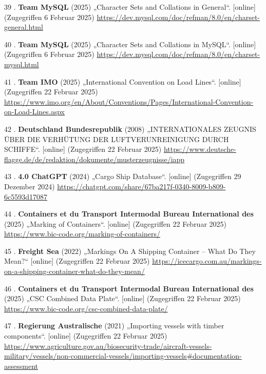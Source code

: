 \documentclass[
    headings=optiontotocandhead,%
    twoside,
    numbers=noenddot,%
    12pt, %
    titlepage, %
    parskip=full, %
    listof=leveldown, 
    numbers=noenddot, %
    a4paper,DIV=14,
    BCOR=15mm,
]{scrbook}
\newlength{\cslhangindent}
\newenvironment{cslreferences}%
  {\setlength{\parindent}{0pt}%
  \everypar{\setlength{\hangindent}{\cslhangindent}}\ignorespaces}%
  {\par}
\begin{document}
\begin{cslreferences}
\leavevmode\hypertarget{ref-DB-character-set}{}%
39 . \textbf{Team MySQL} (2025) „Character Sets and Collations in
General``. {[}online{]} (Zugegriffen 6 Februar 2025)
\url{https://dev.mysql.com/doc/refman/8.0/en/charset-general.html}

\leavevmode\hypertarget{ref-mysql-character-set}{}%
40 . \textbf{Team MySQL} (2025) „Character Sets and Collations in
MySQL``. {[}online{]} (Zugegriffen 6 Februar 2025)
\url{https://dev.mysql.com/doc/refman/8.0/en/charset-mysql.html}

\leavevmode\hypertarget{ref-imo}{}%
41 . \textbf{Team IMO} (2025) „International Convention on Load Lines``.
{[}online{]} (Zugegriffen 22 Februar 2025)
\url{https://www.imo.org/en/About/Conventions/Pages/International-Convention-on-Load-Lines.aspx}

\leavevmode\hypertarget{ref-iapp}{}%
42 . \textbf{Deutschland Bundesrepublik} (2008) „INTERNATIONALES ZEUGNIS
ÜBER DIE VERHÜTUNG DER LUFTVERUNREINIGUNG DURCH SCHIFFE``. {[}online{]}
(Zugegriffen 22 Februar 2025)
\url{https://www.deutsche-flagge.de/de/redaktion/dokumente/musterzeugnisse/iapp}

\leavevmode\hypertarget{ref-gpt-schiff-db}{}%
43 . \textbf{4.0 ChatGPT} (2024) „Cargo Ship Database``. {[}online{]}
(Zugegriffen 29 Dezember 2024)
\url{https://chatgpt.com/share/67ba217f-0340-8009-b809-6c5593d17087}

\leavevmode\hypertarget{ref-bic-code}{}%
44 . \textbf{Containers et du Transport Intermodal Bureau International
des} (2025) „Marking of Containers``. {[}online{]} (Zugegriffen 22
Februar 2025) \url{https://www.bic-code.org/marking-of-containers/}

\leavevmode\hypertarget{ref-icecargo}{}%
45 . \textbf{Freight Sea} (2022) „Markings On A Shipping Container --
What Do They Mean?{}`` {[}online{]} (Zugegriffen 22 Februar 2025)
\url{https://icecargo.com.au/markings-on-a-shipping-container-what-do-they-mean/}

\leavevmode\hypertarget{ref-bic-code-csc}{}%
46 . \textbf{Containers et du Transport Intermodal Bureau International
des} (2025) „CSC Combined Data Plate``. {[}online{]} (Zugegriffen 22
Februar 2025) \url{https://www.bic-code.org/csc-combined-data-plate/}

\leavevmode\hypertarget{ref-tct}{}%
47 . \textbf{Regierung Australische} (2021) „Importing vessels with
timber components``. {[}online{]} (Zugegriffen 22 Februar 2025)
\url{https://www.agriculture.gov.au/biosecurity-trade/aircraft-vessels-military/vessels/non-commercial-vessels/importing-vessels\#documentation-assessment}


\end{cslreferences}
\end{document}

